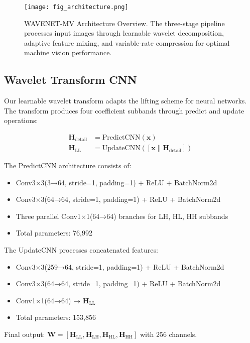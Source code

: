 \documentclass[conference]{IEEEtran}
\begin{document}
\begin{figure}[htbp]
\centering
\texttt{[image: fig\_architecture.png]}
\caption{WAVENET-MV Architecture Overview. The three-stage pipeline processes input images through learnable wavelet decomposition, adaptive feature mixing, and variable-rate compression for optimal machine vision performance.}
\label{fig:architecture}
\end{figure}

\subsection{Wavelet Transform CNN}

Our learnable wavelet transform adapts the lifting scheme \cite{daubechies1998factoring} for neural networks. The transform produces four coefficient subbands through predict and update operations:

\begin{align}
\mathbf{H}_{\text{detail}} &= \text{PredictCNN}(\mathbf{x}) \\
\mathbf{H}_{\text{LL}} &= \text{UpdateCNN}([\mathbf{x} \| \mathbf{H}_{\text{detail}}])
\end{align}

The PredictCNN architecture consists of:
\begin{itemize}
\item Conv3×3(3→64, stride=1, padding=1) + ReLU + BatchNorm2d
\item Conv3×3(64→64, stride=1, padding=1) + ReLU + BatchNorm2d
\item Three parallel Conv1×1(64→64) branches for LH, HL, HH subbands
\item Total parameters: 76,992
\end{itemize}

The UpdateCNN processes concatenated features:
\begin{itemize}
\item Conv3×3(259→64, stride=1, padding=1) + ReLU + BatchNorm2d
\item Conv3×3(64→64, stride=1, padding=1) + ReLU + BatchNorm2d
\item Conv1×1(64→64) → $\mathbf{H}_{\text{LL}}$
\item Total parameters: 153,856
\end{itemize}

Final output: $\mathbf{W} = [\mathbf{H}_{\text{LL}}, \mathbf{H}_{\text{LH}}, \mathbf{H}_{\text{HL}}, \mathbf{H}_{\text{HH}}]$ with 256 channels.
\end{document}
